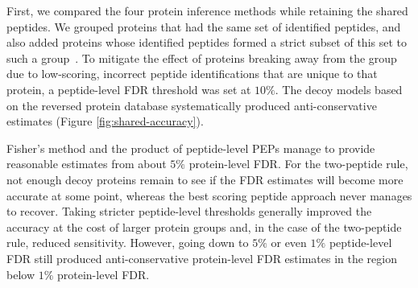\documentclass{article}
\begin{document}
First, we compared the four protein inference methods while retaining
the shared peptides. We grouped proteins that had the same set of
identified peptides, and also added proteins whose identified peptides
formed a strict subset of this set to such a
group~\cite{serang2012review}. To mitigate the effect of proteins
breaking away from the group due to low-scoring, incorrect peptide
identifications that are unique to that protein, a peptide-level FDR
threshold was set at $10\%$. The decoy models based on the reversed
protein database systematically produced anti-conservative estimates
(Figure \ref{fig:shared-accuracy}).

Fisher's method and the product of peptide-level PEPs manage to
provide reasonable estimates from about $5\%$ protein-level FDR. For
the two-peptide rule, not enough decoy proteins remain to see if the
FDR estimates will become more accurate at some point, whereas the
best scoring peptide approach never manages to recover. Taking
stricter peptide-level thresholds generally improved the accuracy at
the cost of larger protein groups and, in the case of the two-peptide
rule, reduced sensitivity. However, going down to $5\%$ or even $1\%$
peptide-level FDR still produced anti-conservative protein-level FDR
estimates in the region below $1\%$ protein-level FDR.
\end{document}

